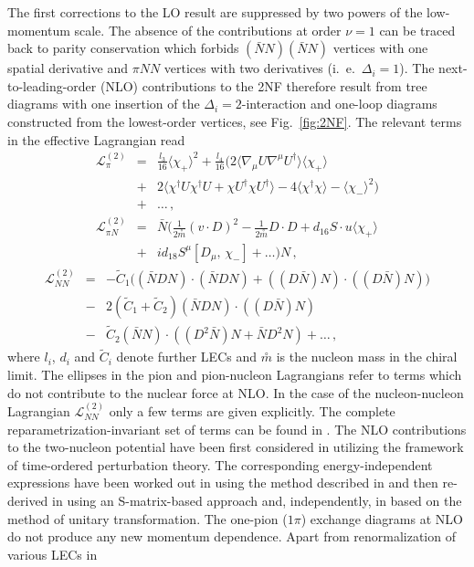 \documentclass[aps,rmp,nofootinbib,twocolumn,floatfix]{revtex4}
\newcommand{\krig}[1]{\stackrel{\circ}{#1}}
\newcommand{\beqa}{\begin{eqnarray}}
\newcommand{\eeqa}{\end{eqnarray}}
\newcommand{\nn}{\nonumber \\ }
\begin{document}
The first corrections to the LO result are suppressed by two powers of the
low-momentum scale.  The absence of the
contributions at order $\nu =1$ can be traced back to parity conservation  which forbids 
$( \bar NN)( \bar NN)$ vertices with one spatial derivative and $\pi NN$ vertices with two derivatives
(i.~e.~$\Delta_i =1$). The next-to-leading-order (NLO) contributions to the
2NF therefore
result from tree diagrams with one insertion of the $\Delta_i=2$-interaction
and one-loop diagrams constructed from the lowest-order vertices, see
Fig.~\ref{fig:2NF}. The relevant terms in the effective Lagrangian read \cite{Gasser:1987rb}
\beqa
\mathcal{L}_{\pi}^{(2)} &=&\frac{l_3}{16} \langle \chi_+ \rangle^2 
+ \frac{l_4}{16} \Big( 2 \langle \nabla_\mu U \nabla^\mu U^\dagger 
\rangle \langle \chi_+ \rangle \nn
&+& 2 \langle \chi^\dagger U \chi^\dagger U + \chi U^\dagger \chi U^\dagger 
\rangle - 4 \langle \chi^\dagger
\chi \rangle - \langle \chi_- \rangle^2 \Big) \nn
&+& \ldots\,, \nn
\mathcal{L}_{\pi N}^{(2)} &=& \bar N \bigg( \frac{1}{2 \krig{m}} (v \cdot D)^2 
- \frac{1}{ 2 \krig{m}}
D \cdot D + d_{16} S \cdot u \langle \chi_+ \rangle \nn
&+& i d_{18} S^\mu [ D_\mu , \, \chi_-]
+ \ldots
 \bigg) N \,,\nonumber
\eeqa
\beqa
\mathcal{L}_{NN}^{(2)} &=& - \tilde C_1 \big( ( \bar N D N) \cdot  ( \bar N D N) 
+ ( ( D \bar N) N) \cdot  ((D  \bar N) N) \big) \nn
&-&  2 (\tilde C_1  + \tilde C_2 )  ( \bar N D N) \cdot  ( (D \bar N ) N) \nn
&-&  \tilde C_2   ( \bar N N) \cdot  ( (D^2 \bar N ) N + \bar N D^2 N) + \ldots
\,, 
\label{lagr2}
\eeqa
where $l_i$, $d_i$ and $\tilde C_i$ denote further LECs  and $\krig m$ is the
nucleon mass in the chiral limit. The ellipses in the pion and pion-nucleon
Lagrangians refer to terms which do not contribute to the nuclear force at
NLO. In the case of the nucleon-nucleon Lagrangian
$\mathcal{L}_{NN}^{(2)}$ only a few terms are given explicitly.  The complete
reparametrization-invariant set of terms can be found in \cite{Epelbaum:2000kv}. 
The NLO contributions to the two-nucleon potential have been first  
considered in \cite{Ordonez:1993tn,Ordonez:1995rz} utilizing the
framework of time-ordered perturbation theory. The corresponding
energy-independent expressions have been worked out in \cite{Friar:1994zz}
using the method described in \cite{Friar:1977xh} and then re-derived in
\cite{Kaiser:1997mw} using an S-matrix-based approach and, independently,  in
\cite{Epelbaum:1998ka,Epelbaum:1999dj} based on the method of unitary transformation.  
The one-pion ($1\pi$) exchange diagrams at NLO do not produce any
new momentum dependence. Apart from renormalization of various LECs in
\end{document}

